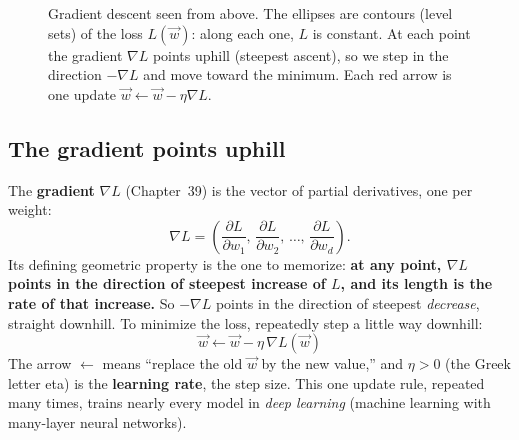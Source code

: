 \begin{figure}[htbp]
\centering
{}
\caption{Gradient descent seen from above. The ellipses are contours (level sets) of the
loss $L(\vec{w})$: along each one, $L$ is constant. At each point the gradient $\nabla L$
points uphill (steepest ascent), so we step in the direction $-\nabla L$ and move toward
the minimum. Each red arrow is one update $\vec{w}\leftarrow\vec{w}-\eta\nabla L$.}
\label{ch34:fig-gd}
\end{figure}

\subsection{The gradient points uphill}

The \textbf{gradient} $\nabla L$ (Chapter~39) is the vector of partial derivatives, one per weight:
\[
\nabla L = \left(\frac{\partial L}{\partial w_1},\,\frac{\partial L}{\partial w_2},\,
\ldots,\,\frac{\partial L}{\partial w_d}\right).
\]
Its defining geometric property is the one to memorize: \textbf{at any point, $\nabla L$
points in the direction of steepest increase of $L$, and its length is the rate of that
increase.} So $-\nabla L$ points in the direction of steepest \emph{decrease}, straight
downhill. To minimize the loss, repeatedly step a little way downhill:
\[
\boxed{\;\vec{w} \leftarrow \vec{w} - \eta\,\nabla L(\vec{w})\;}
\]
The arrow $\leftarrow$ means ``replace the old $\vec{w}$ by the new value,'' and $\eta>0$
(the Greek letter eta) is the \textbf{learning rate}, the step size. This one update rule,
repeated many times, trains nearly every model in \emph{deep learning} (machine learning
with many-layer neural networks).

